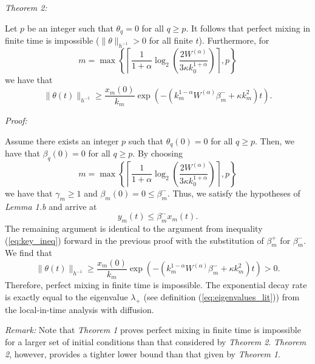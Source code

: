 \begin{flushleft}
{\it Theorem 2:}
\end{flushleft}
Let  $p$ be an integer such that $\theta_{q}=0$ for all $q\geq p$. It follows that perfect mixing in finite time is impossible ($\|\theta\|_{h^{-1}}>0$ for all finite $t$). Furthermore, for 
\begin{equation}
m=\max\left\{\left\lceil\frac{1}{1+\alpha}\log_{2}\left(\frac{2W^{(\alpha)}}{3\kappa k_{0}^{1+\alpha}}\right)\right\rceil, p \right\}
\end{equation}
we have that
\begin{equation}
\|\theta(t)\|_{h^{-1}}\geq \frac{x_{m}(0)}{k_{m}} \exp(-(k_{m}^{1-\alpha}W^{(\alpha)}\beta_{m}^{-}+\kappa k_m^2)t).
\end{equation}
\begin{flushleft}
{\it Proof: }
\end{flushleft}
Assume there exists an integer $p$ such that $\theta_{q}(0)=0$ for all $q\geq p$.  Then, we have that $\beta_{q}(0)=0$ for all $q\geq p$.  By choosing 
\begin{equation}
m=\max\left\{\left\lceil\frac{1}{1+\alpha}\log_{2}\left(\frac{2W^{(\alpha)}}{3\kappa k_{0}^{1+\alpha}}\right)\right\rceil, p \right\}
\end{equation}
we have that $\gamma_{m}\geq 1$ and $\beta_{m}(0)=0\leq \beta_{m}^{-}$. Thus, we satisfy the hypotheses of {\it Lemma 1.b} and arrive at
\begin{equation}
y_{m}(t)\leq \beta_{m}^{-} x_{m}(t).
\end{equation}
The remaining argument is identical to the argument from inequality (\ref{eq:key_ineq}) forward in the previous proof with the substitution of $\beta_{m}^{+}$ for $\beta_{m}^{-}$. We find that
\begin{equation}
\|\theta(t)\|_{h^{-1}}\geq \frac{x_{m}(0)}{k_{m}} \exp(-(k_{m}^{1-\alpha}W^{(\alpha)}\beta_{m}^{-}+\kappa k_m^2)t)>0.
\end{equation}
Therefore, perfect mixing in finite time is impossible. The exponential decay rate is exactly equal to the eigenvalue $\lambda_{+}$ (see definition (\ref{eq:eigenvalues_lit})) from the local-in-time analysis with diffusion.

\begin{flushleft}
{\it Remark: } 
Note that {\it Theorem 1} proves perfect mixing in finite time is impossible for a larger set of initial conditions than that considered by {\it Theorem 2}. {\it Theorem 2}, however, provides a tighter lower bound than that given by {\it Theorem 1}.
\end{flushleft}

